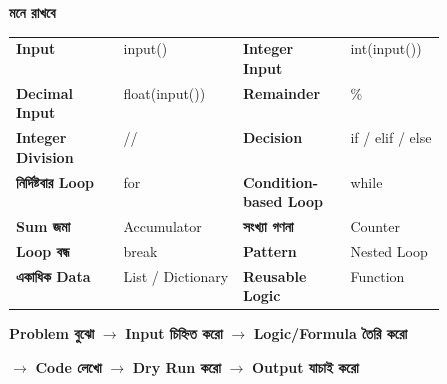 \begin{rememberbox}

\textbf{\color{deepOrange}মনে রাখবে}

\begin{tabularx}
{\linewidth}
{
>{\bfseries\RaggedRight\arraybackslash}p{0.25\linewidth}
Y
>{\bfseries\RaggedRight\arraybackslash}p{0.25\linewidth}
Y
}

Input
&
\textenglish{\ttfamily input()}
&
Integer Input
&
\textenglish{\ttfamily int(input())}
\\[0.5mm]

Decimal Input
&
\textenglish{\ttfamily float(input())}
&
Remainder
&
\textenglish{\ttfamily \%}
\\[0.5mm]

Integer Division
&
\textenglish{\ttfamily //}
&
Decision
&
\textenglish{\ttfamily if / elif / else}
\\[0.5mm]

নির্দিষ্টবার Loop
&
\textenglish{\ttfamily for}
&
Condition-based Loop
&
\textenglish{\ttfamily while}
\\[0.5mm]

Sum জমা
&
Accumulator
&
সংখ্যা গণনা
&
Counter
\\[0.5mm]

Loop বন্ধ
&
\textenglish{\ttfamily break}
&
Pattern
&
Nested Loop
\\[0.5mm]

একাধিক Data
&
List / Dictionary
&
Reusable Logic
&
Function
\\

\end{tabularx}

\medskip

\begin{center}

\textbf{Problem বুঝো}
\(\longrightarrow\)
\textbf{Input চিহ্নিত করো}
\(\longrightarrow\)
\textbf{Logic/Formula তৈরি করো}

\medskip

\(\longrightarrow\)
\textbf{Code লেখো}
\(\longrightarrow\)
\textbf{Dry Run করো}
\(\longrightarrow\)
\textbf{Output যাচাই করো}

\end{center}

\end{rememberbox}

\small

